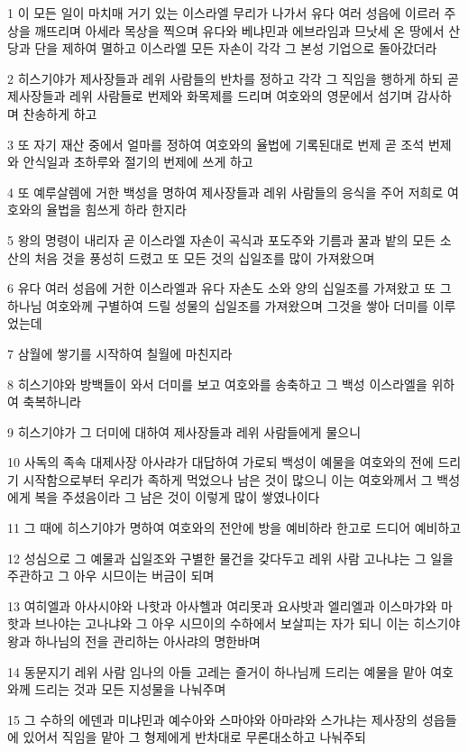 \par 1 이 모든 일이 마치매 거기 있는 이스라엘 무리가 나가서 유다 여러 성읍에 이르러 주상을 깨뜨리며 아세라 목상을 찍으며 유다와 베냐민과 에브라임과 므낫세 온 땅에서 산당과 단을 제하여 멸하고 이스라엘 모든 자손이 각각 그 본성 기업으로 돌아갔더라
\par 2 히스기야가 제사장들과 레위 사람들의 반차를 정하고 각각 그 직임을 행하게 하되 곧 제사장들과 레위 사람들로 번제와 화목제를 드리며 여호와의 영문에서 섬기며 감사하며 찬송하게 하고
\par 3 또 자기 재산 중에서 얼마를 정하여 여호와의 율법에 기록된대로 번제 곧 조석 번제와 안식일과 초하루와 절기의 번제에 쓰게 하고
\par 4 또 예루살렘에 거한 백성을 명하여 제사장들과 레위 사람들의 응식을 주어 저희로 여호와의 율법을 힘쓰게 하라 한지라
\par 5 왕의 명령이 내리자 곧 이스라엘 자손이 곡식과 포도주와 기름과 꿀과 밭의 모든 소산의 처음 것을 풍성히 드렸고 또 모든 것의 십일조를 많이 가져왔으며
\par 6 유다 여러 성읍에 거한 이스라엘과 유다 자손도 소와 양의 십일조를 가져왔고 또 그 하나님 여호와께 구별하여 드릴 성물의 십일조를 가져왔으며 그것을 쌓아 더미를 이루었는데
\par 7 삼월에 쌓기를 시작하여 칠월에 마친지라
\par 8 히스기야와 방백들이 와서 더미를 보고 여호와를 송축하고 그 백성 이스라엘을 위하여 축복하니라
\par 9 히스기야가 그 더미에 대하여 제사장들과 레위 사람들에게 물으니
\par 10 사독의 족속 대제사장 아사랴가 대답하여 가로되 백성이 예물을 여호와의 전에 드리기 시작함으로부터 우리가 족하게 먹었으나 남은 것이 많으니 이는 여호와께서 그 백성에게 복을 주셨음이라 그 남은 것이 이렇게 많이 쌓였나이다
\par 11 그 때에 히스기야가 명하여 여호와의 전안에 방을 예비하라 한고로 드디어 예비하고
\par 12 성심으로 그 예물과 십일조와 구별한 물건을 갖다두고 레위 사람 고나냐는 그 일을 주관하고 그 아우 시므이는 버금이 되며
\par 13 여히엘과 아사시야와 나핫과 아사헬과 여리못과 요사밧과 엘리엘과 이스마갸와 마핫과 브나야는 고나냐와 그 아우 시므이의 수하에서 보살피는 자가 되니 이는 히스기야왕과 하나님의 전을 관리하는 아사랴의 명한바며
\par 14 동문지기 레위 사람 임나의 아들 고레는 즐거이 하나님께 드리는 예물을 맡아 여호와께 드리는 것과 모든 지성물을 나눠주며
\par 15 그 수하의 에덴과 미냐민과 예수아와 스마야와 아마랴와 스가냐는 제사장의 성읍들에 있어서 직임을 맡아 그 형제에게 반차대로 무론대소하고 나눠주되
